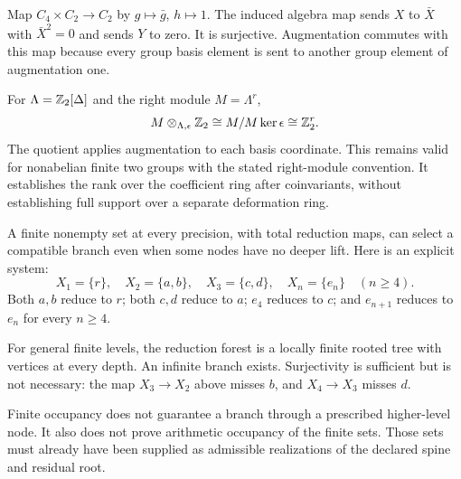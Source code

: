 Map $C_4\times C_2\to C_2$ by $g\mapsto\bar g$, $h\mapsto1$. The induced algebra map sends $X$ to $\bar X$ with $\bar X^2=0$ and sends $Y$ to zero. It is surjective. Augmentation commutes with this map because every group basis element is sent to another group element of augmentation one.

For $\Lambda=\mathbb Z_2[\Delta]$ and the right module $M=\Lambda^r$,
\[
M\otimes_{\Lambda,\epsilon}\mathbb Z_2
\cong M/M\ker\epsilon\cong\mathbb Z_2^r.
\]
The quotient applies augmentation to each basis coordinate. This remains valid for nonabelian finite two groups with the stated right-module convention. It establishes the rank over the coefficient ring after coinvariants, without establishing full support over a separate deformation ring.


A finite nonempty set at every precision, with total reduction maps, can select a compatible branch even when some nodes have no deeper lift. Here is an explicit system:
\[
X_1=\{r\},\quad X_2=\{a,b\},\quad X_3=\{c,d\},\quad
X_n=\{e_n\}\quad(n\ge4).
\]
Both $a,b$ reduce to $r$; both $c,d$ reduce to $a$; $e_4$ reduces to $c$; and $e_{n+1}$ reduces to $e_n$ for every $n\ge4$.


For general finite levels, the reduction forest is a locally finite rooted tree with vertices at every depth. An infinite branch exists. Surjectivity is sufficient but is not necessary: the map $X_3\to X_2$ above misses $b$, and $X_4\to X_3$ misses $d$.

Finite occupancy does not guarantee a branch through a prescribed higher-level node. It also does not prove arithmetic occupancy of the finite sets. Those sets must already have been supplied as admissible realizations of the declared spine and residual root.

